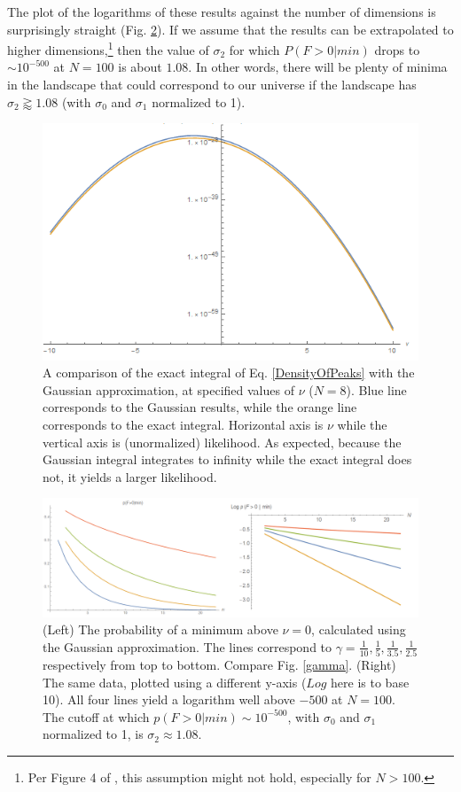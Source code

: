 \documentclass[12pt]{article}
\begin{document}
The plot of the logarithms of these results against the number of dimensions is surprisingly straight (Fig. \ref{PVaryingWithNGaussian}). If we assume that the results can be extrapolated to higher dimensions,\footnote{Per Figure 4 of \cite{Yamada2018}, this assumption might not hold, especially for $N >100$.} then the value of $\sigma_2$ for which $P(F>0|min)$ drops to $\sim 10^{-500}$ at $N = 100$ is about $1.08$. In other words, there will be plenty of minima in the landscape that could correspond to our universe if the landscape has $\sigma_2 \gtrapprox 1.08$ (with $\sigma_0$ and $\sigma_1$ normalized to 1).

\begin{figure} 
  \centering
  \includegraphics[width=\linewidth]{Comparison.png}
  \caption{A comparison of the exact integral of Eq. \ref{DensityOfPeaks} with the Gaussian approximation, at specified values of $\nu$ ($N=8$). Blue line corresponds to the Gaussian results, while the orange line corresponds to the exact integral. Horizontal axis is $\nu$ while the vertical axis is (unormalized) likelihood. As expected, because the Gaussian integral integrates to infinity while the exact integral does not, it yields a larger likelihood.}
  \label{Comparison}
\end{figure}

\begin{figure} 
  \centering
  \includegraphics[width=\linewidth]{PVaryingWithNGaussian.png}
  \caption{(Left) The probability of a minimum above $\nu=0$, calculated using the Gaussian approximation. The lines correspond to $\gamma = \frac{1}{10}, \frac{1}{5}, \frac{1}{3.5}, \frac{1}{2.5}$ respectively from top to bottom. Compare Fig. \ref{gamma}. (Right) The same data, plotted using a different y-axis ($Log$ here is to base 10). All four lines yield a logarithm well above $-500$ at $N=100$. The cutoff at which $p(F>0|min) \sim 10^{-500}$, with $\sigma_0$ and $\sigma_1$ normalized to 1,  is $\sigma_2 \approx 1.08$.}
  \label{PVaryingWithNGaussian}
\end{figure}
\end{document}
